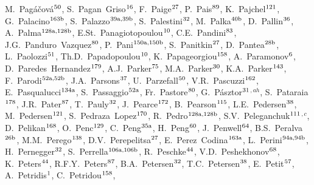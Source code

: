 \begin{flushleft}
M.~Pag\'{a}\v{c}ov\'{a}$^\textrm{\scriptsize 50}$,
S.~Pagan~Griso$^\textrm{\scriptsize 16}$,
F.~Paige$^\textrm{\scriptsize 27}$,
P.~Pais$^\textrm{\scriptsize 89}$,
K.~Pajchel$^\textrm{\scriptsize 121}$,
G.~Palacino$^\textrm{\scriptsize 163b}$,
S.~Palazzo$^\textrm{\scriptsize 39a,39b}$,
S.~Palestini$^\textrm{\scriptsize 32}$,
M.~Palka$^\textrm{\scriptsize 40b}$,
D.~Pallin$^\textrm{\scriptsize 36}$,
A.~Palma$^\textrm{\scriptsize 128a,128b}$,
E.St.~Panagiotopoulou$^\textrm{\scriptsize 10}$,
C.E.~Pandini$^\textrm{\scriptsize 83}$,
J.G.~Panduro~Vazquez$^\textrm{\scriptsize 80}$,
P.~Pani$^\textrm{\scriptsize 150a,150b}$,
S.~Panitkin$^\textrm{\scriptsize 27}$,
D.~Pantea$^\textrm{\scriptsize 28b}$,
L.~Paolozzi$^\textrm{\scriptsize 51}$,
Th.D.~Papadopoulou$^\textrm{\scriptsize 10}$,
K.~Papageorgiou$^\textrm{\scriptsize 158}$,
A.~Paramonov$^\textrm{\scriptsize 6}$,
D.~Paredes~Hernandez$^\textrm{\scriptsize 179}$,
A.J.~Parker$^\textrm{\scriptsize 75}$,
M.A.~Parker$^\textrm{\scriptsize 30}$,
K.A.~Parker$^\textrm{\scriptsize 143}$,
F.~Parodi$^\textrm{\scriptsize 52a,52b}$,
J.A.~Parsons$^\textrm{\scriptsize 37}$,
U.~Parzefall$^\textrm{\scriptsize 50}$,
V.R.~Pascuzzi$^\textrm{\scriptsize 162}$,
E.~Pasqualucci$^\textrm{\scriptsize 134a}$,
S.~Passaggio$^\textrm{\scriptsize 52a}$,
Fr.~Pastore$^\textrm{\scriptsize 80}$,
G.~P\'asztor$^\textrm{\scriptsize 31}$$^{,ah}$,
S.~Pataraia$^\textrm{\scriptsize 178}$,
J.R.~Pater$^\textrm{\scriptsize 87}$,
T.~Pauly$^\textrm{\scriptsize 32}$,
J.~Pearce$^\textrm{\scriptsize 172}$,
B.~Pearson$^\textrm{\scriptsize 115}$,
L.E.~Pedersen$^\textrm{\scriptsize 38}$,
M.~Pedersen$^\textrm{\scriptsize 121}$,
S.~Pedraza~Lopez$^\textrm{\scriptsize 170}$,
R.~Pedro$^\textrm{\scriptsize 128a,128b}$,
S.V.~Peleganchuk$^\textrm{\scriptsize 111}$$^{,c}$,
D.~Pelikan$^\textrm{\scriptsize 168}$,
O.~Penc$^\textrm{\scriptsize 129}$,
C.~Peng$^\textrm{\scriptsize 35a}$,
H.~Peng$^\textrm{\scriptsize 60}$,
J.~Penwell$^\textrm{\scriptsize 64}$,
B.S.~Peralva$^\textrm{\scriptsize 26b}$,
M.M.~Perego$^\textrm{\scriptsize 138}$,
D.V.~Perepelitsa$^\textrm{\scriptsize 27}$,
E.~Perez~Codina$^\textrm{\scriptsize 163a}$,
L.~Perini$^\textrm{\scriptsize 94a,94b}$,
H.~Pernegger$^\textrm{\scriptsize 32}$,
S.~Perrella$^\textrm{\scriptsize 106a,106b}$,
R.~Peschke$^\textrm{\scriptsize 44}$,
V.D.~Peshekhonov$^\textrm{\scriptsize 68}$,
K.~Peters$^\textrm{\scriptsize 44}$,
R.F.Y.~Peters$^\textrm{\scriptsize 87}$,
B.A.~Petersen$^\textrm{\scriptsize 32}$,
T.C.~Petersen$^\textrm{\scriptsize 38}$,
E.~Petit$^\textrm{\scriptsize 57}$,
A.~Petridis$^\textrm{\scriptsize 1}$,
C.~Petridou$^\textrm{\scriptsize 158}$,

\end{flushleft}
